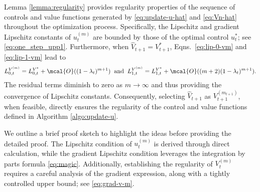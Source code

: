 \documentclass{article}
\begin{document}
Lemma \ref{lemma:regularity} provides  regularity properties of the sequence of controls and value functions generated by \eqref{eq:update-u-hat} and \eqref{eq:Vn-hat}  throughout the optimization process. Specifically, the Lipschitz and gradient Lipschitz constants of $u_{t}^{(m)}$ are bounded by those of the optimal control $u_t^*$; see \eqref{eq:one_step_upp1}. Furthermore, when $\widehat{V}_{t+1} = V_{t+1}^*$,  Eqns.~\eqref{eq:lip-0-vm} and \eqref{eq:lip-1-vm} lead to 
\begin{align*}
    L_{0, t}^{V^{(m)}} = L_{0, t}^{V^*} + \mcal{O}((1 - \lambda_t)^{m+1}) \;\; \text{and}\;\; L_{1, t}^{V^{(m)}} = L_{1, t}^{V^*} + \mcal{O}((m+2)(1 - \lambda_t)^{m+1}).
\end{align*}
The residual terms diminish to zero as $m \to \infty$ and thus providing the convergence of Lipschitz constants.
Consequently, selecting $\widehat{V}_{t+1}$ as ${V}_{t+1}^{(m_{t+1})}$, when feasible, directly ensures the regularity of the control and value functions defined in Algorithm \ref{algo:update-u}. %


%

We outline a brief proof sketch to highlight the ideas before providing the detailed proof. The Lipschitz condition of $u_t^{(m)}$ is derived through direct calculation, while the gradient Lipschitz condition leverages the integration by parts formula \eqref{eq:magic}. Additionally, establishing the regularity of $V_t^{(m)}$ requires a careful analysis of the gradient expression, along with a tightly controlled upper bound; see \eqref{eq:grad-v-m}.
\end{document}
